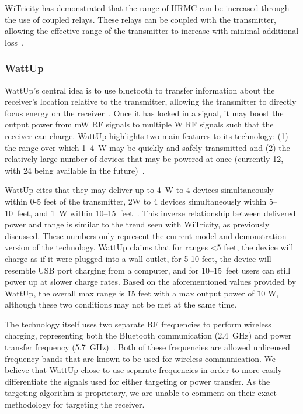 WiTricity has demonstrated that the range of HRMC can be increased through the use of coupled relays. These relays can be coupled with the transmitter, allowing the effective range of the transmitter to increase with minimal additional loss~\cite{butler_tour_2013}.

\subsubsection{WattUp}
WattUp's central idea is to use bluetooth to transfer information about the receiver's location relative to the transmitter, allowing the transmitter to directly focus energy on the receiver~\cite{energouscorporation2016}. Once it has locked in a signal, it may boost the output power from mW RF signals to multiple W RF signals such that the receiver can charge. WattUp highlights two main features to its technology: (1) the range over which \numrange{1}{4}~W may be quickly and safely transmitted and (2) the relatively large number of devices that may be powered at once (currently 12, with 24 being available in the future)~\cite{energouscorporation2016}.

WattUp cites that they may deliver up to 4~W to 4 devices simultaneously within 0-5 feet of the transmitter, 2W to 4 devices simultaneously within \numrange{5}{10}~feet, and 1~W within \numrange{10}{15}~feet~\cite{energouscorporation2016}. This inverse relationship between delivered power and range is similar to the trend seen with WiTricity, as previously discussed. These numbers only represent the current model and demonstration version of the technology. WattUp claims that for ranges <5 feet, the device will charge as if it were plugged into a wall outlet, for 5-10 feet, the device will resemble USB port charging from a computer, and for \numrange{10}{15}~feet users can still power up at slower charge rates. Based on the aforementioned values provided by WattUp, the overall max range is \~15 feet with a max output power of \~10 W, although these two conditions may not be met at the same time.

The technology itself uses two separate RF frequencies to perform wireless charging, representing both the Bluetooth communication (2.4~GHz) and power transfer frequency (5.7~GHz)~\cite{energouscorporation2016}. Both of these frequencies are allowed unlicensed frequency bands that are known to be used for wireless communication. We believe that WattUp chose to use separate frequencies in order to more easily differentiate the signals used for either targeting or power transfer. As the targeting algorithm is proprietary, we are unable to comment on their exact methodology for targeting the receiver.

